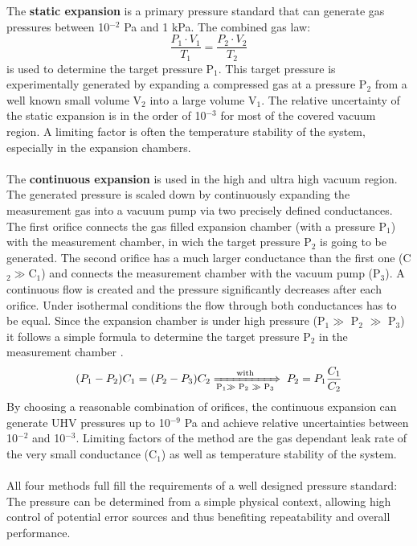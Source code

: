 \noindent
The \textbf{static expansion} is a primary pressure standard that can generate gas pressures between 10$^{-2}$ Pa and 1 kPa. The combined gas law:
\begin{equation}
\frac{P_1\cdot V_1}{T_1} = \frac{P_2\cdot V_2}{T_2}
\label{Boyle-Mariotte-law}
\end{equation}
is used to determine the target pressure P${_1}$. This target pressure is experimentally generated by expanding a compressed gas at a pressure P$_2$ from a well known small volume V${_2}$ into a large volume V$_1$. The relative uncertainty of the static expansion is in the order of 10$^{-3}$ for most of the covered vacuum region. A limiting factor is often the temperature stability of the system, especially in the expansion chambers.\\\\ The \textbf{continuous expansion} is used in the high and ultra high vacuum region. The generated pressure is scaled down by continuously expanding the measurement gas into a vacuum pump via two precisely defined conductances. The first orifice connects the gas filled expansion chamber (with a pressure P$_1$) with the measurement chamber, in wich the target pressure P$_2$ is going to be generated. The second orifice has a much larger conductance than the first one (C$_2$$\gg$C$_1$) and connects the measurement chamber with the vacuum pump (P$_3$). A continuous flow is created and the pressure significantly decreases after each orifice. Under isothermal conditions the flow through both conductances has to be equal. Since the expansion chamber is under high pressure (P$_1$$\gg$ P$_2$ $\gg$ P$_3$) it follows a simple formula to determine the target pressure P$_2$ in the measurement chamber \cite{Jousten2016}.
\begin{equation}
(P_1-P_2) C_1 =(P_2-P_3)C_2 \xRightarrow[\text{P$_1$$\gg$ P$_2$ $\gg$ P$_3$}]{\text{with}} \; P_2=P_1 \frac{C_1}{C_2}
\label{isothermal-condition}
\end{equation}
By choosing a reasonable combination of orifices, the continuous expansion can generate UHV pressures up to 10$^{-9}$ Pa and achieve relative uncertainties between 10$^{-2}$ and 10$^{-3}$. Limiting factors of the method are the gas dependant leak rate of the very small conductance (C$_1$) as well as temperature stability of the system.\\\\ 
All four methods full fill the requirements of a well designed pressure standard: The pressure can be determined from a simple physical context, allowing high control of potential error sources and thus benefiting repeatability and overall performance.
